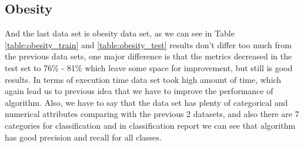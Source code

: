 \documentclass{article}
\begin{document}
\subsection{Obesity}
And the last data set is obesity data set, as we can see in Table \ref{table:obesity_train} and \ref{table:obesity_test} results 
don't differ too much from the previous data sets, one major difference is that the metrics decreased in the test set to 76\% - 81\%
which leave some space for improvement, but still is good results. In terms of execution time data set took high amount of time, which
again lead us to previous idea that we have to improve the performance of algorithm. Also, we have to say that the data set has plenty of categorical and numerical
attributes comparing with the previous 2 datasets, and also there are 7 categories for classification and in classification report 
 we can see that algorithm has good precision and recall for all classes.
\end{document}
